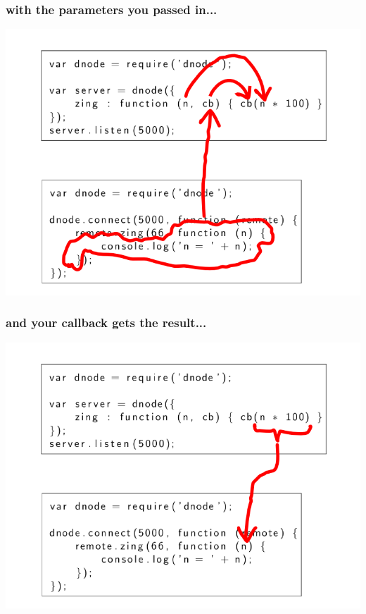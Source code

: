 \documentclass{beamer}
\begin{document}
\begin{frame}
\frametitle{with the parameters you passed in...}
\includegraphics[scale=0.6]{images/zing_flow_4.png}
\end{frame}

\begin{frame}
\frametitle{and your callback gets the result...}
\includegraphics[scale=0.6]{images/zing_flow_5.png}
\end{frame}
\end{document}
